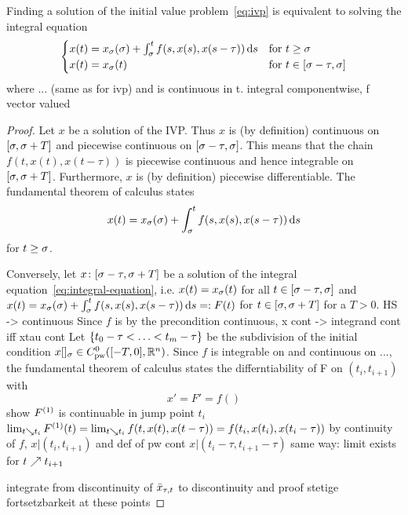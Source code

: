     \begin{lemma}\label{lm:integral-equation}
        Finding a solution of the initial value problem~\eqref{eq:ivp} is equivalent to solving the integral equation
        \begin{equation}\label{eq:integral-equation}
            \begin{cases}
                x(t) = x_{\tzero}(\tzero) + \int_{\tzero}^t f(s,x(s),x(s-\tau))\dx[s] & \text{for } t\geq\tzero\\
                x(t) = x_{\tzero}(t) & \text{for } t\in [\tzero-\tau,\tzero]
            \end{cases}
        \end{equation}
        where ... (same as for ivp)
        and is continuous in t.
        integral componentwise, f vector valued
    \end{lemma}
    \begin{proof}
        Let $x$ be a solution of the IVP. Thus $x$ is (by definition) continuous on $\compactum{\tzero}{\tzero+T}$ and piecewise continuous on $\compactum{\tzero-\tau}{\tzero}$. This means that the chain $f(t,x(t),x(t-\tau))$ is piecewise continuous and hence integrable on $\compactum{\tzero}{\tzero+T}$. Furthermore, $x$ is (by definition) piecewise differentiable.
        The fundamental theorem of calculus states
        \begin{equation*}
            x(t) = x_{\tzero}(\tzero) + \int_{\tzero}^t f(s,x(s),x(s-\tau))\dx[s]
        \end{equation*}
        for $t\geq\tzero$.

        Conversely, let $x\from [\tzero-\tau,\tzero+T]$ be a solution of the integral equation~\eqref{eq:integral-equation}, i.e. $x(t)=x_{\tzero}(t)$ for all $t\in\compactum{\tzero-\tau}{\tzero}$ and $x(t) = x_{\tzero}(\tzero) + \int_{\tzero}^t f(s,x(s),x(s-\tau))\dx[s] =: F(t)$ for $t\in\compactum{\tzero}{\tzero+T}$ for a $T>0$.
        HS -> continuous
        Since $f$ is by the precondition continuous, x cont -> integrand cont iff xtau cont
        Let $\set{t_0-\tau < \ldots < t_m-\tau}$ be the subdivision of the initial condition $\x_{\tzero}\in\statespace$.
        Since $f$ is integrable on and continuous on ..., the fundamental theorem of calculus states the differntiability of F on $(t_i,t_{i+1})$ with
        \begin{equation}
            x'=F'=f()
        \end{equation}
        show $\D{F}$ is continuable in jump point $t_i$
        $\lim_{t\downto t_i}\D{F}(t)=\lim_{t\downto t_i}f(t,x(t),x(t-\tau))=f(t_i,x(t_i),x(t_i-\tau))$ by continuity of $f$, $x|(t_i,t_{i+1})$ and def of pw cont $x|(t_i-\tau,t_{i+1}-\tau)$
        same way: limit exists for $t\upto t_{i+1}$



        integrate from discontinuity of $\xbartaut{t}$ to discontinuity and proof stetige fortsetzbarkeit at these points
    \end{proof}

